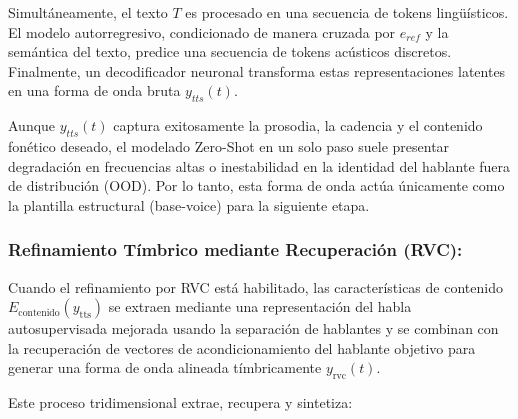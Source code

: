 \documentclass[conference]{IEEEtran}
\begin{document}
Simultáneamente, el texto $T$ es procesado en una secuencia de tokens lingüísticos. El modelo autorregresivo, condicionado de manera cruzada por $e_{ref}$ y la semántica del texto, predice una secuencia de tokens acústicos discretos. Finalmente, un decodificador neuronal transforma estas representaciones latentes en una forma de onda bruta $y_{tts}(t)$.

Aunque $y_{tts}(t)$ captura exitosamente la prosodia, la cadencia y el contenido fonético deseado, el modelado Zero-Shot en un solo paso suele presentar degradación en frecuencias altas o inestabilidad en la identidad del hablante fuera de distribución (OOD). Por lo tanto, esta forma de onda actúa únicamente como la plantilla estructural (base-voice) para la siguiente etapa.
\subsubsection{Refinamiento Tímbrico mediante Recuperación (RVC):}

Cuando el refinamiento por RVC está habilitado, las características de contenido $E_{\text{contenido}}(y_{\text{tts}})$ se extraen mediante una representación del habla autosupervisada mejorada usando la separación de hablantes \cite{softness2023contentvec} y se combinan con la recuperación de vectores de acondicionamiento del hablante objetivo para generar una forma de onda alineada tímbricamente $y_{\text{rvc}}(t)$.

Este proceso tridimensional extrae, recupera y sintetiza:
\end{document}
